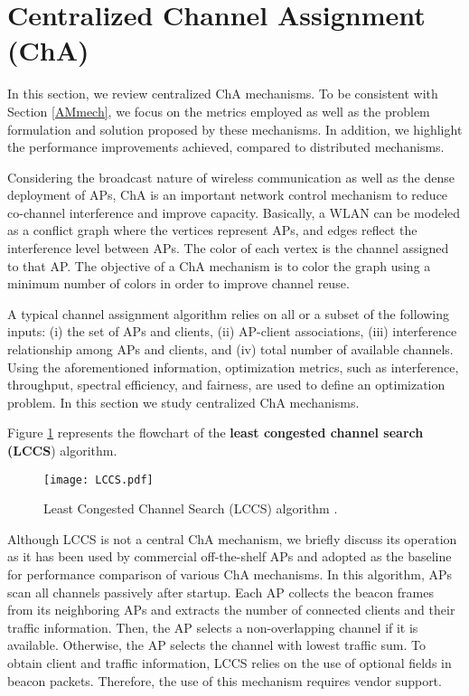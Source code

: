


\section{Centralized Channel Assignment (ChA)}
\label{CMmech}
In this section, we review centralized ChA mechanisms.
To be consistent with Section \ref{AMmech}, we focus on the metrics employed as well as the problem formulation and solution proposed by these mechanisms.
In addition, we highlight the performance improvements achieved, compared to distributed mechanisms.

Considering the broadcast nature of wireless communication as well as the dense deployment of APs, ChA is an important network control mechanism to reduce co-channel interference and improve capacity.
Basically, a WLAN can be modeled as a conflict graph where the vertices represent APs, and edges reflect the interference level between APs. 
The color of each vertex is the channel assigned to that AP. 
The objective of a ChA mechanism is to color the graph using a minimum number of colors in order to improve channel reuse.

A typical channel assignment algorithm relies on all or a subset of the following inputs: (i) the set of APs and clients, (ii) AP-client associations, (iii) interference relationship among APs and clients, and (iv) total number of available channels. 
Using the aforementioned information, optimization metrics, such as interference, throughput, spectral efficiency, and fairness, are used to define an optimization problem. 
In this section we study centralized ChA mechanisms.



Figure \ref{fig_LCCS} represents the flowchart of the \textbf{least congested channel search (LCCS}) \cite{LCCS} algorithm. 
%
\begin{figure}[!t]
	\centering
	\texttt{[image: LCCS.pdf]}
	\caption{Least Congested Channel Search (LCCS) algorithm \cite{LCCS}.}
	\label{fig_LCCS}
\end{figure}
%
Although LCCS is not a central ChA mechanism, we briefly discuss its operation as it has been used by commercial off-the-shelf APs and adopted as the baseline for performance comparison of various ChA mechanisms.
In this algorithm, APs scan all channels passively after startup. 
Each AP collects the beacon frames from its neighboring APs and extracts the number of connected clients and their traffic information. 
Then, the AP selects a non-overlapping channel if it is available. 
Otherwise, the AP selects the channel with lowest traffic sum.
To obtain client and traffic information, LCCS relies on the use of optional fields in beacon packets.
Therefore, the use of this mechanism requires vendor support.

